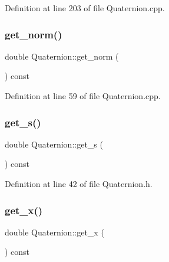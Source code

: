 Definition at line 203 of file Quaternion.\+cpp.

\mbox{\label{class_quaternion_a09a489ba1d33f53cb92b88d6ca2880c4}} 
\subsubsection{\texorpdfstring{get\+\_\+norm()}{get\_norm()}}
{\footnotesize\ttfamily double Quaternion\+::get\+\_\+norm (\begin{DoxyParamCaption}{ }\end{DoxyParamCaption}) const}



Definition at line 59 of file Quaternion.\+cpp.

\mbox{\label{class_quaternion_a086532bcfc22518e3d95eb0f3463a898}} 
\subsubsection{\texorpdfstring{get\+\_\+s()}{get\_s()}}
{\footnotesize\ttfamily double Quaternion\+::get\+\_\+s (\begin{DoxyParamCaption}{ }\end{DoxyParamCaption}) const\hspace{0.3cm}{\ttfamily [inline]}}



Definition at line 42 of file Quaternion.\+h.

\mbox{\label{class_quaternion_abbce3f8d66aa2740e4c5f7beccbe2339}} 
\subsubsection{\texorpdfstring{get\+\_\+x()}{get\_x()}}
{\footnotesize\ttfamily double Quaternion\+::get\+\_\+x (\begin{DoxyParamCaption}{ }\end{DoxyParamCaption}) const\hspace{0.3cm}{\ttfamily [inline]}}



